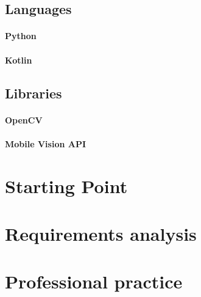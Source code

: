 \subsection{Languages}
\paragraph{Python}
\paragraph{Kotlin}

\subsection{Libraries}
\label{section:open_cv}
\paragraph{OpenCV}
\paragraph{Mobile Vision API}


\section{Starting Point}

\section{Requirements analysis}


\section{Professional practice}
